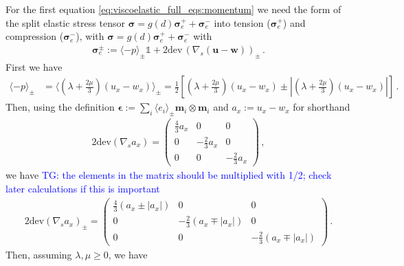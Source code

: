 \documentclass[11pt,a4paper]{article}
\newcommand{\tg}[1]{\textcolor{blue}{TG: #1} }
\newcommand{\bb}[1]{\boldsymbol{#1}}
\newcommand{\dev}{\text{dev}}
\begin{document}
For the first equation \eqref{eq:viscoelastic_full_eqs:momentum} we need the form of the split elastic stress tensor $\bb{\sigma} = g(d) \bb{\sigma}_e^+ + \bb{\sigma}_e^-$ into tension ($\bb{\sigma}_e^+$) and compression ($\bb{\sigma}_e^-$), with $\bb{\sigma} = g(d) \bb{\sigma}_e^+ + \bb{\sigma}_e^-$ with 
\begin{align*}
\bb{\sigma}_e^{\pm} := \langle -p \rangle_{\pm} \mathbb{1} + 2 \dev \, \left( \nabla_s(\bb{u-w})\right)_{\pm}
\,.
\end{align*}
First we have
\begin{align*}
    \langle -p \rangle_\pm 
    & = \langle \left(\lambda + \frac{2 \mu}{3} \right) \left(u_x  -w_x \right)\rangle_{\pm}
    = \frac{1}{2} \left[ \left(\lambda + \frac{2 \mu}{3} \right) \left(u_x -w_x \right) \pm \left| \left(\lambda + \frac{2 \mu}{3} \right) \left(u_x - w_x \right) \right| \right]
    \,.
\end{align*}
Then, using the definition $\bb{\epsilon} := \sum_i \langle e_i \rangle_{\pm} \bb{m}_i \otimes \bb{m}_i$ and $a_x := u_x - w_x$ for shorthand
\begin{align*}
    2 \dev \left( \nabla_s a_x \right)
    =
    \begin{pmatrix}
    \frac{4}{3} a_x & 0 & 0 \\
    0 & -\frac{2}{3} a_x & 0 \\
    0 & 0 & -\frac{2}{3} a_x
    \end{pmatrix}
    \,,
\end{align*}
we have
%
\tg{the elements in the matrix should be multiplied with 1/2; check later calculations if this is important}
%
\begin{align*}
    2 \dev \left( \nabla_s a_x \right)_\pm
    =
    \begin{pmatrix}
    \frac{4}{3} (a_x \pm |a_x|) & 0 & 0 \\
    0 & -\frac{2}{3} (a_x \mp |a_x|) & 0 \\
    0 & 0 & -\frac{2}{3} (a_x \mp |a_x|)
    \end{pmatrix}
    \,.
\end{align*}
Then, assuming $\lambda, \mu \geq 0$, we have
\end{document}
